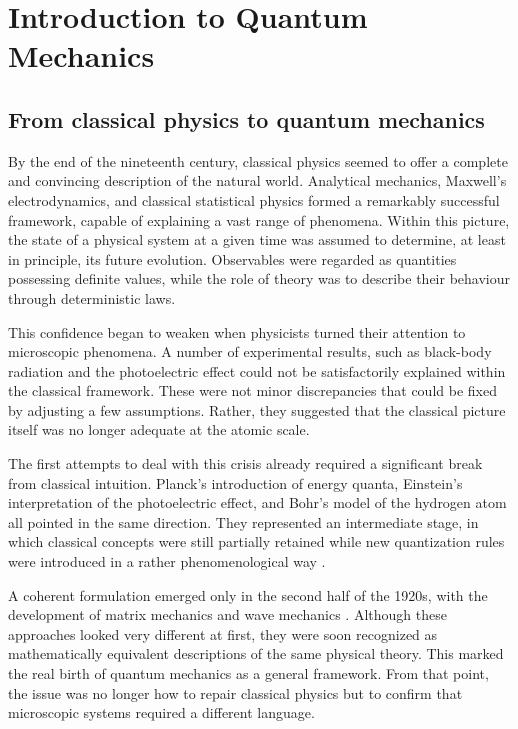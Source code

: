 \chapter{Introduction to Quantum Mechanics}
\label{chap:introduction_to_quantum_mechanics}

\section{From classical physics to quantum mechanics}
\label{sec:from_classical_physics_to_quantum_mechanics}

By the end of the nineteenth century, classical physics seemed to offer a complete and convincing description of the natural world.
Analytical mechanics, Maxwell's electrodynamics, and classical statistical physics formed a remarkably successful framework, capable of explaining a vast range of phenomena.
Within this picture, the state of a physical system at a given time was assumed to determine, at least in principle, its future evolution.
Observables were regarded as quantities possessing definite values, while the role of theory was to describe their behaviour through deterministic laws.

This confidence began to weaken when physicists turned their attention to microscopic phenomena.
A number of experimental results, such as black-body radiation \cite{Planck01} and the photoelectric effect \cite{Einstein05} could not be satisfactorily explained within the classical framework.
These were not minor discrepancies that could be fixed by adjusting a few assumptions.
Rather, they suggested that the classical picture itself was no longer adequate at the atomic scale.

The first attempts to deal with this crisis already required a significant break from classical intuition.
Planck's introduction of energy quanta, Einstein's interpretation of the photoelectric effect, and Bohr's model of the hydrogen atom all pointed in the same direction.
They represented an intermediate stage, in which classical concepts were still partially retained while new quantization rules were introduced in a rather phenomenological way \cite{Bohr13}.

A coherent formulation emerged only in the second half of the 1920s, with the development of matrix mechanics \cite{Heisenberg25, BornJordan25} and wave mechanics \cite{Schrodinger26}.
Although these approaches looked very different at first, they were soon recognized as mathematically equivalent descriptions of the same physical theory.
This marked the real birth of quantum mechanics as a general framework.
From that point, the issue was no longer how to repair classical physics but to confirm that microscopic systems required a different language.

